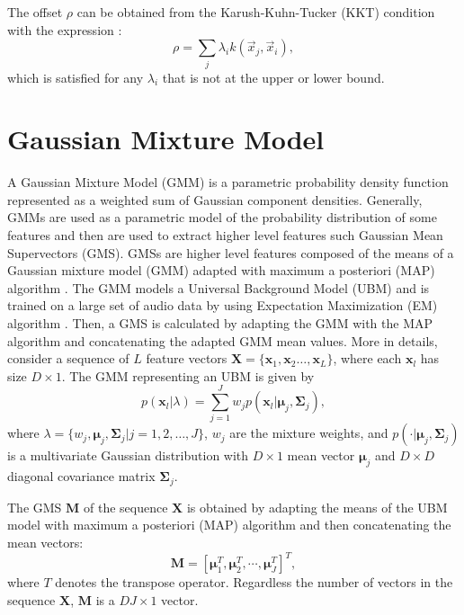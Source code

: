 The offset $\rho$ can be obtained from the Karush-Kuhn-Tucker (KKT) condition with the expression \cite{boyd2004convex}:
\begin{equation}
\rho = \sum_j \lambda_i k(\vec{x}_j,\vec{x}_i),
\end{equation}
which is satisfied for any $\lambda_i$ that is not at the upper or lower bound.



\section{Gaussian Mixture Model}
A Gaussian Mixture Model (GMM) is a parametric probability density function represented as a weighted sum of Gaussian component densities. Generally, GMMs are used as a parametric model of the probability distribution of some features and then are used to extract higher level features such Gaussian Mean Supervectors (GMS). GMSs are higher level features composed of the means of a Gaussian mixture model (GMM) adapted with maximum a posteriori (MAP) algorithm \cite{kinnunen10, Campbell2006}. The GMM models a Universal Background Model (UBM) and is trained on a large set of audio data by using Expectation Maximization (EM) algorithm \cite{bilmes1998gentle}. Then, a GMS is calculated by adapting the GMM with the MAP algorithm \cite{reynolds10} and concatenating the adapted GMM mean values.
More in details, consider a sequence of  $L$ feature vectors $\mathbf{X}=\{\mathbf{x}_1,\mathbf{x}_2\ldots,\mathbf{x}_L\}$, where each $\mathbf{x}_l$  has size $D\times 1$. The GMM representing an UBM is given by
\begin{equation}\label{eq:ubm}
p(\mathbf{x}_l|\lambda) = \sum_{j=1}^{J}w_j p(\mathbf{x}_l|\boldsymbol{\mu}_j,\boldsymbol{\Sigma}_j),
\end{equation}
where $\lambda=\{w_j,\boldsymbol{\mu}_j,\boldsymbol{\Sigma}_j | j=1,2,\ldots,J\}$, $w_j$ are the mixture weights, and $p(\cdot|\boldsymbol{\mu}_j,\boldsymbol{\Sigma}_j)$ is a multivariate Gaussian distribution with $D\times 1$ mean vector $\boldsymbol{\mu}_j$ and $D \times D$ diagonal covariance matrix $\boldsymbol{\Sigma}_j$.

The GMS $\mathbf{M}$ of the sequence $\mathbf{X}$ is obtained by adapting the means of the UBM model with maximum a posteriori (MAP) algorithm and then concatenating the mean vectors: 
\begin{equation}
\mathbf{M} = [\boldsymbol{\mu}_1^T,\boldsymbol{\mu}_2^T,\cdots,\boldsymbol{\mu}_J^T]^T,
\end{equation}
where $T$ denotes the transpose operator. Regardless the number of vectors in the sequence $\mathbf{X}$, $\mathbf{M}$ is a $DJ\times 1$ vector.

